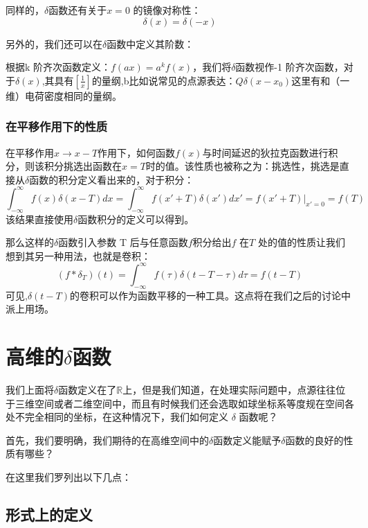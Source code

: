 \documentclass[lang=cn,10pt,newtx,bibend=biber,device=pad]{elegantbook}
\begin{document}
同样的，$\delta$函数还有关于$x=0$ 的镜像对称性：
\begin{equation}
    \delta(x) = \delta(-x)    
\end{equation}

另外的，我们还可以在$\delta$函数中定义其阶数：
\begin{property}
根据k 阶齐次函数定义：$f(ax) = a^k f(x)$，我们将$\delta$函数视作-1 阶齐次函数，对于$\delta(x)$,其具有$[\frac{1}{x}]$的量纲,b比如说常见的点源表达：$Q\delta(x-x_0)$这里有和（一维）电荷密度相同的量纲。
\end{property}
\vspace{1em}
\subsubsection{在平移作用下的性质}

在平移作用$x\rightarrow x-T$作用下，如何函数$f(x)$与时间延迟的狄拉克函数进行积分，则该积分挑选出函数在$x=T$时的值。该性质也被称之为：挑选性\cite{bracewell1978fourier}，挑选是直接从$\delta$函数的积分定义看出来的，对于积分：
\begin{equation}
    \int_{-\infty}^\infty f(x)\delta(x-T)dx=\int_{-\infty}^\infty f(x'+T)\delta(x')dx' = f(x'+T)|_{x'=0}=f(T)
\end{equation}
该结果直接使用$\delta$函数积分的定义可以得到。

那么这样的$\delta$函数引入参数 T 后与任意函数$f$积分给出$f$ 在$T$ 处的值的性质让我们想到其另一种用法，也就是卷积：
\begin{equation}
    (f\ast\delta_T)(t) = \int_{-\infty}^\infty f(\tau)\delta(t-T-\tau)d\tau = f(t-T)
\end{equation}
可见,$\delta(t-T)$的卷积可以作为函数平移的一种工具。这点将在我们之后的讨论中派上用场。
\section{高维的$\delta$函数}
我们上面将$\delta$函数定义在了$\mathbb{R}$上，但是我们知道，在处理实际问题中，点源往往位于三维空间或者二维空间中，而且有时候我们还会选取如球坐标系等度规在空间各处不完全相同的坐标，在这种情况下，我们如何定义 $\delta$ 函数呢？

首先，我们要明确，我们期待的在高维空间中的$\delta$函数定义能赋予$\delta$函数的良好的性质有哪些？

在这里我们罗列出以下几点：

\subsection{形式上的定义}
\end{document}
